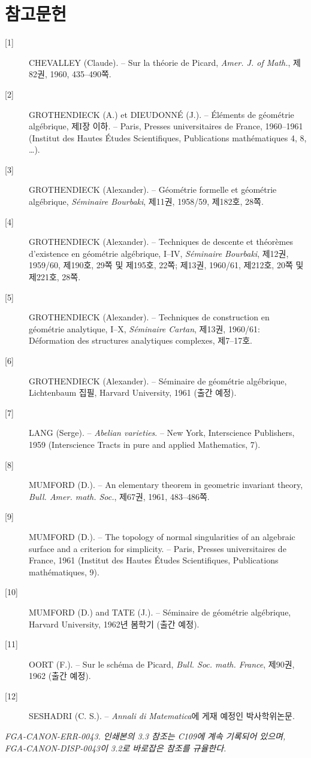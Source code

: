 \section*{참고문헌}

\begin{description}
\item[{[1]}] CHEVALLEY (Claude). -- Sur la théorie de Picard,
\emph{Amer. J. of Math.}, 제82권, 1960, 435--490쪽.

\item[{[2]}] GROTHENDIECK (A.) et DIEUDONNÉ (J.). -- Éléments de géométrie
algébrique, 제I장 이하. -- Paris, Presses universitaires de France,
1960--1961 (Institut des Hautes Études Scientifiques, Publications
mathématiques 4, 8, \ldots).

\item[{[3]}] GROTHENDIECK (Alexander). -- Géométrie formelle et géométrie
algébrique, \emph{Séminaire Bourbaki}, 제11권, 1958/59,
제182호, 28쪽.

\item[{[4]}] GROTHENDIECK (Alexander). -- Techniques de descente et théorèmes
d'existence en géométrie algébrique, I--IV, \emph{Séminaire Bourbaki}, 제12권,
1959/60, 제190호, 29쪽 및 제195호, 22쪽; 제13권, 1960/61, 제212호, 20쪽 및
제221호, 28쪽.

\item[{[5]}] GROTHENDIECK (Alexander). -- Techniques de construction en
géométrie analytique, I--X, \emph{Séminaire Cartan}, 제13권, 1960/61:
Déformation des structures analytiques complexes, 제7--17호.

\item[{[6]}] GROTHENDIECK (Alexander). -- Séminaire de géométrie algébrique,
Lichtenbaum 집필, Harvard University, 1961 (출간 예정).

\item[{[7]}] LANG (Serge). -- \emph{Abelian varieties}. -- New York,
Interscience Publishers, 1959 (Interscience Tracts in pure and applied
Mathematics, 7).

\item[{[8]}] MUMFORD (D.). -- An elementary theorem in geometric invariant
theory, \emph{Bull. Amer. math. Soc.}, 제67권, 1961, 483--486쪽.

\item[{[9]}] MUMFORD (D.). -- The topology of normal singularities of an
algebraic surface and a criterion for simplicity. -- Paris, Presses
universitaires de France, 1961 (Institut des Hautes Études Scientifiques,
Publications mathématiques, 9).

\item[{[10]}] MUMFORD (D.) and TATE (J.). -- Séminaire de géométrie
algébrique, Harvard University, 1962년 봄학기 (출간 예정).

\item[{[11]}] OORT (F.). -- Sur le schéma de Picard,
\emph{Bull. Soc. math. France}, 제90권, 1962 (출간 예정).

\item[{[12]}] SESHADRI (C. S.). -- \emph{Annali di Matematica}에 게재 예정인
박사학위논문.
\end{description}

\par\smallskip
\begingroup\footnotesize
\noindent\textit{FGA-CANON-ERR-0043. 인쇄본의 3.3 참조는 C109에 계속 기록되어 있으며, FGA-CANON-DISP-0043이 3.2로 바로잡은 참조를 규율한다.}\par
\endgroup
